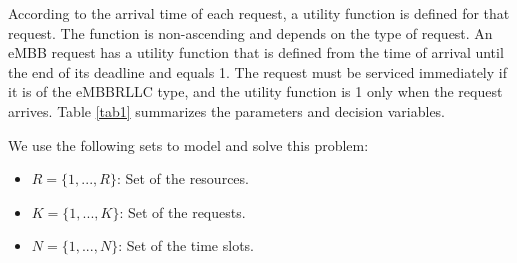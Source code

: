 \documentclass[conference]{IEEEtran}
\begin{document}
According to the arrival time of each request, a utility function is defined for that request. The function is non-ascending and depends on the type of request. An eMBB request has a utility function that is defined from the time of arrival until the end of its deadline and equals 1. The request must be serviced immediately if it is of the eMBBRLLC type, and the utility function is 1 only when the request arrives. Table \ref{tab1} summarizes the parameters and decision variables.

We use the following sets to model and solve this problem:
\begin{itemize}
  \item $R=\{1,...,R\}$: Set of the resources.
  \item $K=\{1,...,K\}$: Set of the requests.
  \item $N=\{1,...,N\}$: Set of the time slots.
\end{itemize}
\end{document}
